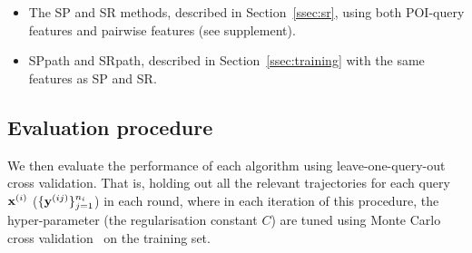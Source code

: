 \begin{itemize}[leftmargin=0.125in]\itemmoveup
\parskip -.05em
\item The SP and SR methods, described in Section~\ref{ssec:sr}, using both POI-query features and pairwise features (see supplement).

\item {\sc SPpath} and {\sc SRpath}, described in Section~\ref{ssec:training} with the same features as SP and SR.
\end{itemize}\itemmoveup

\secmoveup
\subsection{Evaluation procedure}
\textmoveup

We then evaluate the performance of each algorithm using leave-one-query-out cross validation. 
That is, holding out all the relevant trajectories for each query $\mathbf{x}^{({i})}$ (\ie $\{\mathbf{y}^{({ij})}\}_{j=1}^{n_i}$) in each round,
where in each iteration of this procedure,
the hyper-parameter (\eg the regularisation constant $C$) are tuned using Monte Carlo cross validation~\cite{burman1989comparative} on the training set.

